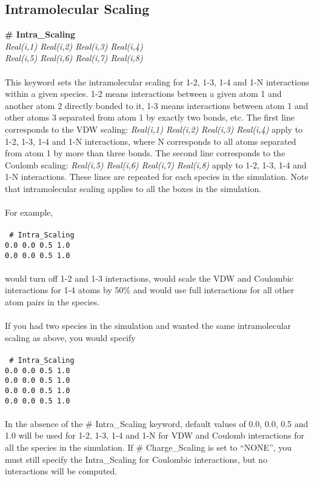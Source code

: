 \subsection{Intramolecular Scaling}\label{sec:Intra_Scaling}
{\bf \# Intra\_Scaling} \\
{\it Real(i,1) Real(i,2) Real(i,3) Real(i,4)} \\ 
{\it Real(i,5) Real(i,6) Real(i,7) Real(i,8)} \\ \\
%
This keyword sets the intramolecular scaling for 1-2, 1-3, 1-4 and 1-N
interactions within a given species. 1-2 means interactions between a
given atom 1 and another atom 2 directly bonded to it, 1-3 means
interactions between atom 1 and other atoms 3 separated from atom 1 by
exactly two bonds, etc. The first line corresponds to the
VDW scaling: {\it Real(i,1) Real(i,2) Real(i,3) Real(i,4)} apply to
1-2, 1-3, 1-4 and 1-N interactions, where N corresponds to all atoms
separated from atom 1 by more than three bonds. 
The second line corresponds to the Coulomb scaling: 
{\it Real(i,5)  Real(i,6) Real(i,7) Real(i,8)} apply to 1-2, 1-3, 1-4
and 1-N interactions. These lines are repeated for
each species in the simulation. Note that intramolecular scaling
applies to all the boxes in the simulation. \\ \\
%
For example, \\ \\
\texttt{
\# Intra\_Scaling \\
0.0 0.0 0.5 1.0 \\
0.0 0.0 0.5 1.0}
\\ \\
would turn off 1-2 and 1-3 interactions, would scale the VDW and
Coulombic interactions for 1-4 atoms by 50\% and would use full
interactions for all other atom pairs in the species. \\ \\
%
If you had two species in the simulation and wanted the same
intramolecular scaling as above, you would specify \\ \\
\texttt{
\# Intra\_Scaling \\
0.0 0.0 0.5 1.0 \\
0.0 0.0 0.5 1.0 \\
0.0 0.0 0.5 1.0 \\
0.0 0.0 0.5 1.0}
\\ \\
In the absence
of the \# Intra\_Scaling keyword, default values of 0.0, 0.0, 0.5 and 1.0 will be used
for 1-2, 1-3, 1-4 and 1-N  for VDW and Coulomb interactions for all
the species in the simulation.  If \# Charge\_Scaling is set to
``NONE'', you must still specify the Intra\_Scaling for Coulombic
interactions, but no interactions will be computed. \
%
%
